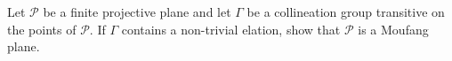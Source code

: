 Let $\mathcal{P}$ be a finite projective plane and let $\Gamma$ be a collineation group transitive on the points of $\mathcal{P}$. If $\Gamma$ contains a non-trivial elation, show that $\mathcal{P}$ is a Moufang plane.
